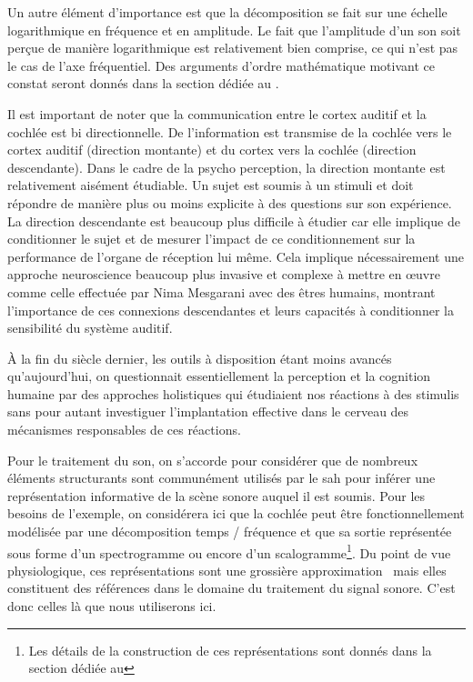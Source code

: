 Un autre élément d'importance est que la décomposition se fait sur une échelle logarithmique en fréquence et en amplitude. Le fait que l'amplitude d'un son soit perçue de manière logarithmique est relativement bien comprise, ce qui n'est pas le cas de l'axe fréquentiel. Des arguments d'ordre mathématique motivant ce constat seront donnés dans la section dédiée au .

Il est important de noter que la communication entre le cortex auditif et la cochlée est bi directionnelle. De l'information est transmise de la cochlée vers le cortex auditif (direction montante) et du cortex vers la cochlée (direction descendante). Dans le cadre de la psycho perception, la direction montante est relativement aisément étudiable. Un sujet est soumis à un stimuli et doit répondre de manière plus ou moins explicite à des questions sur son expérience. La direction descendante est beaucoup plus difficile à étudier car elle implique de conditionner le sujet et de mesurer l'impact de ce conditionnement sur la performance de l'organe de réception lui même. Cela implique nécessairement une approche \og neuroscience \fg beaucoup plus invasive et complexe à mettre en \oe{}uvre comme celle effectuée par Nima Mesgarani avec des êtres humains, montrant l'importance de ces connexions descendantes et leurs capacités à conditionner la sensibilité du système auditif\cite{mesgarani2012selective}.

\`A la fin du siècle dernier, les outils à disposition étant moins avancés qu'aujourd'hui, on questionnait essentiellement la perception et la cognition humaine par des approches \og holistiques \fg qui étudiaient nos réactions à des stimulis sans pour autant investiguer l'implantation effective dans le cerveau des mécanismes responsables de ces réactions.

Pour le traitement du son, on s'accorde pour considérer que de nombreux éléments structurants sont communément utilisés par le sah pour inférer une représentation informative de la scène sonore auquel il est soumis. Pour les besoins de l'exemple, on considérera ici que la cochlée peut être fonctionnellement modélisée par une décomposition temps / fréquence et que sa sortie représentée sous forme d'un spectrogramme ou encore d'un scalogramme\footnote{Les détails de la construction de ces représentations sont donnés dans la section dédiée au }. Du point de vue physiologique, ces représentations sont une grossière approximation~\cite{lyon2017human} mais elles constituent des références dans le domaine du traitement du signal sonore. C'est donc celles là que nous utiliserons ici.

